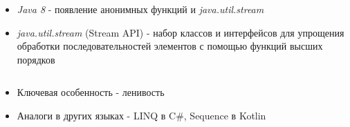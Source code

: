 \begin{frame}
\frametitle{\insertsection} 
\framesubtitle{\insertsubsection}
\begin{itemize}
	\item \textit{Java 8} - появление анонимных функций и \textit{java.util.stream}
	\item \textit{java.util.stream} (Stream API) - набор классов и интерфейсов для упрощения обработки последовательностей элементов с помощью функций высших порядков
	\inputminted{java}{code/StreamsExample.java}
	\item Ключевая особенность - ленивость
	\item Аналоги в других языках - LINQ в C\#, Sequence в Kotlin
\end{itemize}
\end{frame}